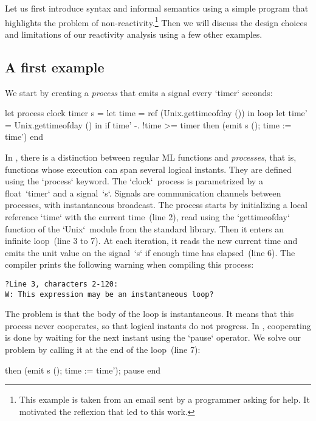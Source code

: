 \documentclass[9pt]{sigplanconf}
\begin{document}
Let us first introduce \rml{} syntax and informal semantics using a simple program that highlights the problem of non-reactivity.\footnote{This example is taken from an email sent by a \rml programmer asking for help. It motivated the reflexion that led to this work.} Then we will discuss the design choices and limitations of our reactivity analysis using a few other examples.

\subsection{A first example}
\label{sec:first_example}

We start by creating a \emph{process} that emits a signal every `timer` seconds:
%
\begin{rmlcl}
let process clock timer s =
  let time = ref (Unix.gettimeofday ()) in
  loop
    let time' = Unix.gettimeofday () in
    if time' -. !time >= timer
    then (emit s (); time := time')
  end
\end{rmlcl}
%
In \rml, there is a distinction between regular ML functions and \emph{processes}, that is, functions whose execution can span several logical instants.  They are defined using the `process` keyword. The `clock`~process is parametrized by a float~`timer` and a signal~`s`. Signals are communication channels between processes, with instantaneous broadcast. The process starts by initializing a local reference `time` with the current time~(line 2), read using the `gettimeofday` function of the `Unix`~module from the standard library. Then it enters an infinite loop~(line 3 to 7). At each iteration, it reads the new current time and emits the unit value on the signal~`s` if enough time has elapsed~(line 6). The compiler prints the following warning when compiling this process:
\begin{lstlisting}
?Line 3, characters 2-120:
W: This expression may be an instantaneous loop?
\end{lstlisting}
The problem is that the body of the loop is instantaneous. It means that this process never cooperates, so that logical instants do not progress. In \rml, cooperating is done by waiting for the next instant using the `pause` operator. We solve our problem by calling it at the end of the loop~(line 7):
\begin{rmlcl}[5]
[...]
    then (emit s (); time := time');
    pause 
  end
\end{rmlcl}
\end{document}
